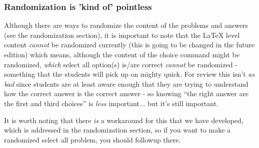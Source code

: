 \documentclass{ximera}
\begin{document}
        \subsubsection*{Randomization is 'kind of' pointless}
            Although there are ways to randomize the content of the problems and answers (see the randomization section), it is important to note that the LaTeX level content \textit{cannot} be randomized currently (this is going to be changed in the future edition) which means, although the content of the choice command might be randomized, \textit{which} select all option(s) is/are correct \textit{cannot} be randomized - something that the students will pick up on mighty quick. For review this isn't \textit{as bad} since students are at least aware enough that they are trying to understand how the correct answer is the correct answer - so knowing ``the right answer are the first and third choices'' is \textit{less} important... but it's still important.
            
            It is worth noting that there \textit{is} a workaround for this that we have developed, which is addressed in the randomization section, so if you want to make a randomized select all problem, you should followup there.
            
        
\end{document}
